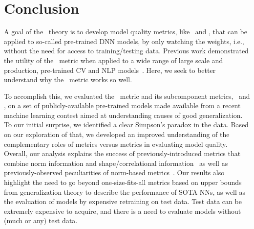 \vspace{-3mm}
\section{Conclusion}
\label{sxn:conclusion}
\vspace{-1mm}


A goal of the \HTSR~theory is to develop model quality metrics, like \ALPHA~and \ALPHAHAT, that can be applied to so-called pre-trained DNN models, by only watching the weights, i.e., without the need for access to training/testing data. 
Previous work demonstrated the utility of the \ALPHAHAT~metric when applied to a wide range of large scale and production, pre-trained CV and NLP models~\cite{MM20a_trends_NatComm}. 
Here, we seek to better understand why the \ALPHAHAT~metric works so well.

To accomplish this, we evaluated the \ALPHAHAT~metric and its subcomponent metrics, 
\ALPHA~and \SPECTRALNORM, on a set of publicly-available pre-trained models made available from a recent machine learning contest aimed at understanding causes of good generalization.
To our initial surprise, we identified a clear Simpson's paradox in the data.
Based on our exploration of that, we developed an improved understanding of the complementary roles of \SCALE metrics versus 
\SHAPE metrics in evaluating model quality.
%
Overall, our analysis explains the success of previously-introduced metrics that combine norm information and shape/correlational information~\cite{MM20a_trends_NatComm} as well as previously-observed peculiarities of norm-based metrics~\cite{JNBx19_fantastic_TR}.
Our results also highlight the need to go beyond one-size-fits-all metrics based on upper bounds from generalization theory to describe the performance of SOTA NNs, as well as the evaluation of models by expensive retraining on test data. 
Test data can be extremely expensive to acquire, and there is a need to evaluate models without (much or any) test data.  %

